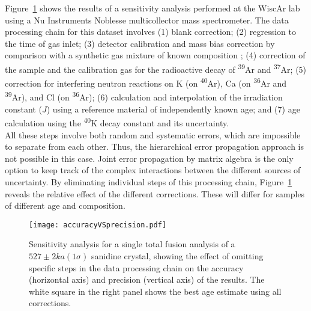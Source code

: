 \documentclass{article}
\begin{document}
Figure~\ref{fig:accuracyVSprecision} shows the results of a
sensitivity analysis performed at the WiscAr lab using a Nu
Instruments Noblesse multicollector mass spectrometer.  The data
processing chain for this dataset involves (1) blank correction; (2)
regression to the time of gas inlet; (3) detector calibration and mass
bias correction by comparison with a synthetic gas mixture of known
composition \citep{jicha2016}; (4) correction of the sample and the
calibration gas for the radioactive decay of \textsuperscript{39}Ar
and \textsuperscript{37}Ar; (5) correction for interfering neutron
reactions on K (on \textsuperscript{40}Ar), Ca (on
\textsuperscript{36}Ar and \textsuperscript{39}Ar), and Cl (on
\textsuperscript{36}Ar); (6) calculation and interpolation of the
irradiation constant ($J$) using a reference material of independently
known age; and (7) age calculation using the \textsuperscript{40}K
decay constant and its uncertainty.\\

All these steps involve both random and systematic errors, which are
impossible to separate from each other. Thus, the hierarchical error
propagation approach is not possible in this case. Joint error
propagation by matrix algebra is the only option to keep track of the
complex interactions between the different sources of uncertainty.  By
eliminating individual steps of this processing chain,
Figure~\ref{fig:accuracyVSprecision} reveals the relative effect of
the different corrections. These will differ for samples of different
age and composition.

\begin{figure}
  \texttt{[image: accuracyVSprecision.pdf]}
  \caption{Sensitivity analysis for a single total fusion analysis of
    a $527 \pm 2 ka (1\sigma)$ sanidine crystal, showing the effect of
    omitting specific steps in the data processing chain on the
    accuracy (horizontal axis) and precision (vertical axis) of the
    results. The white square in the right panel shows the best age
    estimate using all corrections.}
  \label{fig:accuracyVSprecision}
\end{figure}



\end{document}
